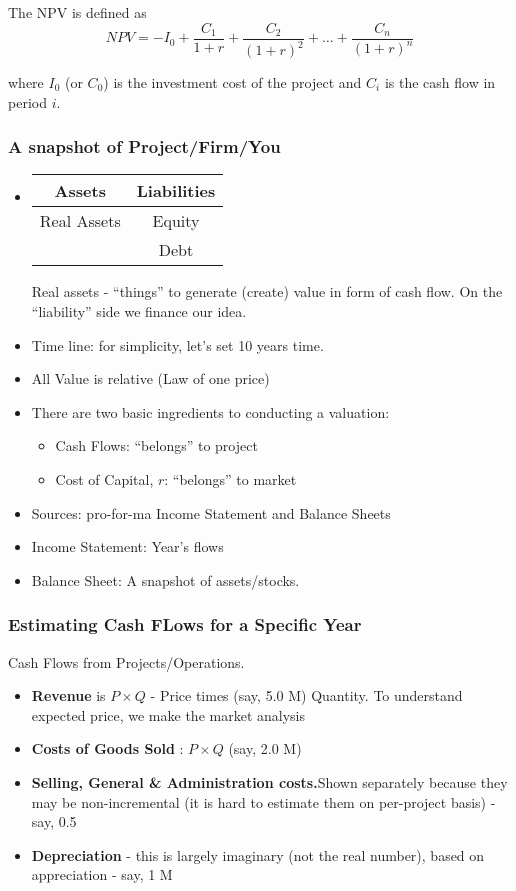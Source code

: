 \documentclass{scrartcl}
\begin{document}
The NPV is defined as $$NPV = -I_0 + \frac{C_1}{1+r} + \frac{C_2}{(1+r)^2} +
\dots + \frac{C_n}{(1+r)^n}$$

where $I_0$ (or $C_0$) is the investment cost of the project and $C_i$ is the
cash flow in period $i$.

\subsubsection*{A snapshot of Project/Firm/You}
\begin{itemize}


\item \begin{tabular}{|c|c|} \hline
    Assets & Liabilities \\
    \hline
    Real Assets &  Equity \\
    & Debt \\
    \hline
  \end{tabular}
  Real assets - ``things'' to generate (create) value in form of cash flow. On
  the ``liability'' side we finance our idea.

\item Time line: for simplicity, let's set 10 years time.
\item All Value is relative (Law of one price)
\item There are two basic ingredients to conducting a valuation:
  \begin{itemize}
  \item Cash Flows: ``belongs'' to project
  \item Cost of Capital, $r$: ``belongs'' to market
  \end{itemize}

\item Sources: pro-for-ma Income Statement and Balance Sheets
\item Income Statement: Year's flows
\item Balance Sheet: A snapshot of assets/stocks.
\end{itemize}

\subsubsection{Estimating Cash FLows for a Specific Year}

Cash Flows from Projects/Operations.
\begin{itemize}
\item {\bf Revenue} is $P \times Q$ - Price times (say, 5.0 M) Quantity. To
  understand expected price, we make the market analysis
\item {\bf Costs of Goods Sold} : $P \times Q$ (say, 2.0 M)
\item {\bf Selling, General \& Administration costs.}Shown separately because
  they may be non-incremental (it is hard to estimate them on per-project basis)
  - say, 0.5
\item {\bf Depreciation} - this is largely imaginary (not the real number),
  based on appreciation - say, 1 M
\end{itemize}
\end{document}
